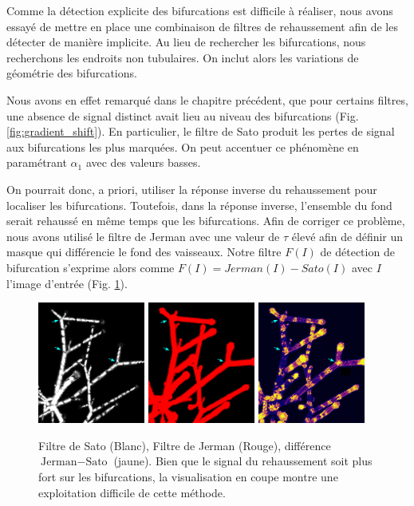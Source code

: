 Comme la détection explicite des bifurcations est difficile à réaliser, nous avons essayé de mettre en place une combinaison de filtres de rehaussement afin de les détecter de manière implicite. Au lieu de rechercher les bifurcations, nous recherchons les endroits non tubulaires. On inclut alors les variations de géométrie des bifurcations.

Nous avons en effet remarqué dans le chapitre précédent, que pour certains filtres, une absence de signal distinct avait lieu au niveau des bifurcations (Fig. \ref{fig:gradient_shift}). En particulier, le filtre de Sato produit les pertes de signal aux bifurcations les plus marquées. On peut accentuer ce phénomène en paramétrant $\alpha_1$ avec des valeurs basses. 

On pourrait donc, a priori, utiliser la réponse inverse du rehaussement pour localiser les bifurcations. Toutefois, dans la réponse inverse, l'ensemble du fond serait rehaussé en même temps que les bifurcations. Afin de corriger ce problème, nous avons utilisé le filtre de Jerman avec une valeur de $\tau$ élevé afin de définir un masque qui différencie le fond des vaisseaux. Notre filtre $F(I)$ de détection de bifurcation s'exprime alors comme $F(I) = Jerman(I) - Sato(I)$ avec $I$ l'image d'entrée (Fig. \ref{fig:subtract_vesselness}). 

\begin{figure}[!ht]
    \centering
    \includegraphics[height=4cm]{Images/SatoFilter_bif.png}
    \includegraphics[height=4cm]{Images/JermanFilter_bif.png}
    \includegraphics[height=4cm]{Images/subJermanSato_bif.png}
    \caption{Filtre de Sato (Blanc), Filtre de Jerman (Rouge), différence $\textrm{Jerman}-\textrm{Sato}$ (jaune). Bien que le signal du rehaussement soit plus fort sur les bifurcations, la visualisation en coupe montre une exploitation difficile de cette méthode.}
    \label{fig:subtract_vesselness}
\end{figure}

